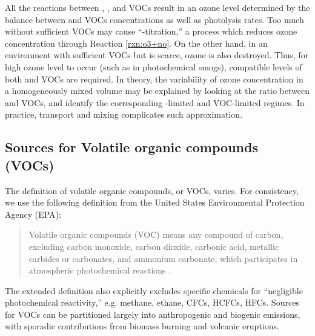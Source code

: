All the reactions between , ,  and VOCs result in an ozone level determined by the balance between  and VOCs concentrations as well as photolysis rates. Too much  without sufficient VOCs may cause ``-titration,'' a process which reduces ozone concentration through Reaction \ref{rxn:o3+no}. On the other hand, in an environment with sufficient VOCs but  is scarce, ozone is also destroyed. Thus, for high ozone level to occur (such as in photochemical smogs), compatible levels of both  and VOCs are required. In theory, the variability of ozone concentration in a homogeneously mixed volume may be explained by looking at the ratio between  and VOCs, and identify the corresponding -limited and VOC-limited regimes. In practice, transport and mixing complicates such approximation.


\subsection{Sources for Volatile organic compounds (VOCs)} \label{ssec:intro/ozone/voc}

	The definition of volatile organic compounds, or VOCs, varies. For consistency, we use the following definition from the United States Environmental Protection Agency (EPA):
	\begin{quotation}
		Volatile organic compounds (VOC) means any compound of carbon, excluding carbon monoxide, carbon dioxide, carbonic acid, metallic carbides or carbonates, and ammonium carbonate, which participates in atmospheric photochemical reactions \citep{EPA:2010ve}.
	\end{quotation}
	The extended definition also explicitly excludes specific chemicals for ``negligible photochemical reactivity,'' e.g. methane, ethane, CFCs, HCFCs, HFCs. Sources for VOCs can be partitioned largely into anthropogenic and biogenic emissions, with sporadic contributions from biomass burning and volcanic eruptions.



